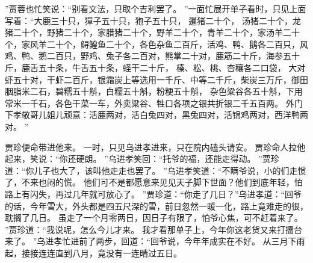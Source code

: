”贾蓉也忙笑说：“别看文法，只取个吉利罢了。
”一面忙展开单子看时，只见上面写着：“大鹿三十只，獐子五十只，狍子五十只，
暹猪二十个，
汤猪二十个，龙猪二十个，野猪二十个，家腊猪二十个，野羊二十个，青羊二十个，家汤羊二十个，家风羊二十个，鲟鳇鱼二十个，各色杂鱼二百斤，活鸡、鸭、鹅各二百只，风鸡、鸭、鹅二百只，野鸡、兔子各二百对，熊掌二十对，鹿筋二十斤，海参五十斤，鹿舌五十条，牛舌五十条，蛏干二十斤，
榛、松、桃、杏穰各二口袋，
大对虾五十对，干虾二百斤，银霜炭上等选用一千斤、中等二千斤，柴炭三万斤，御田胭脂米二石，碧糯五十斛，白糯五十斛，粉粳五十斛，
杂色粱谷各五十斛，下用常米一千石，各色干菜一车，外卖粱谷、牲口各项之银共折银二千五百两。
外门下孝敬哥儿姐儿顽意：活鹿两对，活白兔四对，黑兔四对，活锦鸡两对，西洋鸭两对。
”\par
贾珍便命带进他来。
一时，只见乌进孝进来，只在院内磕头请安。
贾珍命人拉他起来，笑说：“你还硬朗。
”乌进孝笑回：“托爷的福，还能走得动。
”贾珍道：“你儿子也大了，该叫他走走也罢了。
”乌进孝笑道：“不瞒爷说，小的们走惯了，不来也闷的慌。
他们可不是都愿意来见见天子脚下世面？他们到底年轻，怕路上有闪失，再过几年就可放心了。
”贾珍道：“你走了几日？”乌进孝道：“回爷的话，今年雪大，外头都是四五尺深的雪，前日忽然一暖一化，路上竟难走的很，耽搁了几日。
虽走了一个月零两日，因日子有限了，怕爷心焦，可不赶着来了。
”贾珍道：“我说呢，怎么今儿才来。
我才看那单子上，今年你这老货又来打擂台来了。
”乌进孝忙进前了两步，回道：“回爷说，今年年成实在不好。
从三月下雨起，接接连连直到八月，竟没有一连晴过五日。

